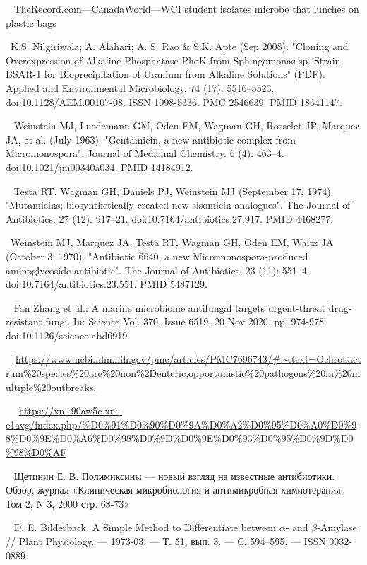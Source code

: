 \documentclass[11pt]{article}
\begin{document}
\begin{thebibliography}{3}
	~ TheRecord.com—CanadaWorld—WCI student isolates microbe that lunches on plastic bags

	~K.S. Nilgiriwala; A. Alahari; A. S. Rao \& S.K. Apte (Sep 2008). "Cloning and Overexpression of Alkaline Phosphatase PhoK from Sphingomonas sp. Strain BSAR-1 for Bioprecipitation of Uranium from Alkaline Solutions" (PDF). Applied and Environmental Microbiology. 74 (17): 5516–5523. doi:10.1128/AEM.00107-08. ISSN 1098-5336. PMC 2546639. PMID 18641147.

	~ Weinstein MJ, Luedemann GM, Oden EM, Wagman GH, Rosselet JP, Marquez JA, et al. (July 1963). "Gentamicin, a new antibiotic complex from Micromonospora". Journal of Medicinal Chemistry. 6 (4): 463–4. doi:10.1021/jm00340a034. PMID 14184912.

	~ Testa RT, Wagman GH, Daniels PJ, Weinstein MJ (September 17, 1974). "Mutamicins; biosynthetically created new sisomicin analogues". The Journal of Antibiotics. 27 (12): 917–21. doi:10.7164/antibiotics.27.917. PMID 4468277.
	
	~Weinstein MJ, Marquez JA, Testa RT, Wagman GH, Oden EM, Waitz JA (October 3, 1970). "Antibiotic 6640, a new Micromonospora-produced aminoglycoside antibiotic". The Journal of Antibiotics. 23 (11): 551–4. doi:10.7164/antibiotics.23.551. PMID 5487129.
	
	~ Fan Zhang et al.: A marine microbiome antifungal targets urgent-threat drug-resistant fungi. In: Science Vol. 370, Issue 6519, 20 Nov 2020, pp. 974-978. doi:10.1126/science.abd6919.

 	~~\url{https://www.ncbi.nlm.nih.gov/pmc/articles/PMC7696743/#:~:text=Ochrobactrum\%20species\%20are\%20non\%2Denteric,opportunistic\%20pathogens\%20in\%20multiple\%20outbreaks.}

	~ ~\url{https://xn--90aw5c.xn--c1avg/index.php/%D0%91%D0%90%D0%9A%D0%A2%D0%95%D0%A0%D0%98%D0%9E%D0%A6%D0%98%D0%9D%D0%9E%D0%93%D0%95%D0%9D%D0%98%D0%AF}

	~
	Щетинин Е. В. Полимиксины — новый взгляд на известные антибиотики. Обзор, журнал «Клиническая микробиология и антимикробная химиотерапия, Том 2, N 3, 2000 стр. 68-73»
	
	~  D. E. Bilderback. A Simple Method to Differentiate between $\alpha$- and $\beta$-Amylase // Plant Physiology. — 1973-03. — Т. 51, вып. 3. — С. 594–595. — ISSN 0032-0889.
	
	~
	
	\end{thebibliography}
	
\end{document}
